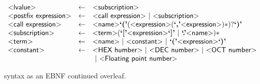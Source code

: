 \begin{figure}[h!]
\[\begin{array}{lcl}
  \pgrammar{lvalue} & \gets & \pgrammar{subscription}\\

  \pgrammar{postfix expression} & \gets & \pgrammar{call expression} ~|~ \pgrammar{subscription}\\

  \pgrammar{call expression} & \gets & \pgrammar{name} \plexer{(}
  (\pgrammar{expression} (\plexer{,} \pgrammar{expression})*)?
  \plexer{)}\\

  \pgrammar{subscription} & \gets & \pgrammar{term} (\plexer{[} \pgrammar{expression} \plexer{]} ~|~
                                                     \plexer{.} \pgrammar{name})*\\

  \pgrammar{term} & \gets & \pgrammar{name} ~|~ \pgrammar{constant} ~|~ \plexer{(} \pgrammar{expression} \plexer{)}\\

  \pgrammar{constant} & \gets & \pgrammar{HEX humber} ~|~ \pgrammar{DEC number} ~|~ \pgrammar{OCT number}\\&&
  ~|~ \pgrammar{Floating point number}\\
\end{array}
\]
  \caption {\pencil{} syntax as an EBNF continued overleaf.}
\end{figure}
